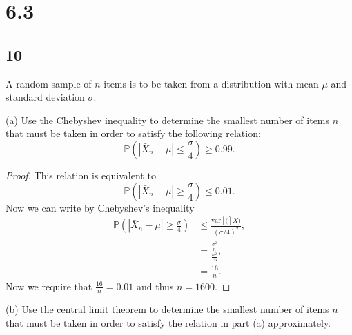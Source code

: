 \documentclass{article}
\renewcommand{\P}[1]{\mathbb{P}\left(#1\right)}
\newcommand{\var}[1]{\text{var}\left[#1\right]}
\begin{document}
\section*{6.3}
\subsection*{10}
A random sample of $n$ items is to be taken from a distribution with mean $\mu$ and
standard deviation $\sigma$.

(a) Use the Chebyshev inequality to determine the smallest
number of items $n$ that must be taken in order to satisfy the following relation:
\begin{equation*}
    \P{|\bar{X}_n - \mu| \leq \frac{\sigma}{4}}\geq 0.99.
\end{equation*}

\begin{proof}
    This relation is equivalent to
    \begin{equation*}
        \P{|\bar{X}_n - \mu| \geq \frac{\sigma}{4}} \leq 0.01.
    \end{equation*}
    Now we can write by Chebyshev's inequality
    \begin{align*}
        \P{|\bar{X}_n - \mu| \geq \frac{\sigma}{4}} & \leq \frac{\var(X)}{(\sigma/4)^2},                \\
                                                    & = \frac{\frac{\sigma^2}{n}}{\frac{\sigma^2}{16}}, \\
                                                    & = \frac{16}{n}.
    \end{align*}
    Now we require that $\frac{16}{n} = 0.01$ and thus $n = 1600$.
\end{proof}

(b) Use the central limit theorem to determine the smallest number of items $n$ that
must be taken in order to satisfy the relation in part (a) approximately.
\end{document}
